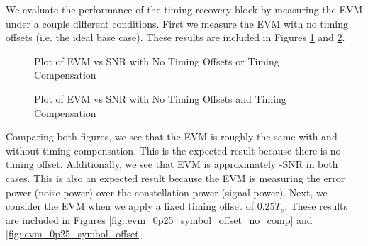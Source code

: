 \documentclass{article}
\begin{document}
We evaluate the performance of the timing recovery block by measuring the EVM under a couple different conditions. First we measure the EVM with no timing offsets (i.e. the ideal base case). These results are included in Figures \ref{fig::evm_no_timing_offset_no_comp} and \ref{fig::evm_no_timing_offset}.

\begin{figure}[H]
	\centerline{}
	\caption{Plot of EVM vs SNR with No Timing Offsets or Timing Compensation}
	\label{fig::evm_no_timing_offset_no_comp}
\end{figure}

\begin{figure}[H]
	\centerline{}
	\caption{Plot of EVM vs SNR with No Timing Offsets and Timing Compensation}
	\label{fig::evm_no_timing_offset}
\end{figure}

Comparing both figures, we see that the EVM is roughly the same with and without timing compensation. This is the expected result because there is no timing offset. Additionally, we see that EVM is approximately -SNR in both cases. This is also an expected result because the EVM is measuring the error power (noise power) over the constellation power (signal power). Next, we consider the EVM when we apply a fixed timing offset of $0.25T_s$. These results are included in Figures \ref{fig::evm_0p25_symbol_offset_no_comp} and \ref{fig::evm_0p25_symbol_offset}.
\end{document}
